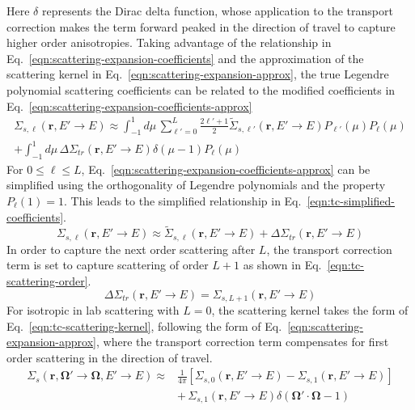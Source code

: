 Here $\delta$ represents the Dirac delta function, whose application to the transport correction makes the term forward peaked in the direction of travel to capture higher order anisotropies. Taking advantage of the relationship in Eq.~\ref{eqn:scattering-expansion-coefficients} and the approximation of the scattering kernel in Eq.~\ref{eqn:scattering-expansion-approx}, the true Legendre polynomial scattering coefficients can be related to the modified coefficients in Eq.~\ref{eqn:scattering-expansion-coefficients-approx}
\begin{equation}
\begin{split}
\Sigma_{s,\ell}\left(\mathbf{r}, E'\rightarrow E \right) \approx \int_{-1}^{1} d\mu \, \sum_{\ell'=0}^L \frac{2 \ell' + 1}{2} \tilde{\Sigma}_{s,\ell'}\left(\mathbf{r}, E'\rightarrow E \right) P_{\ell'}(\mu) P_\ell(\mu) \\ + \int_{-1}^{1} d\mu \, \Delta \Sigma_{\textit{tr}}\left(\mathbf{r}, E'\rightarrow E \right) \delta\left(\mu - 1\right) P_\ell(\mu)
\label{eqn:scattering-expansion-coefficients-approx}
\end{split}
\end{equation}
For $0 \leq \ell \leq L$, Eq.~\ref{eqn:scattering-expansion-coefficients-approx} can be simplified using the orthogonality of Legendre polynomials and the property $P_\ell(1) = 1$. This leads to the simplified relationship in Eq.~\ref{eqn:tc-simplified-coefficients}.
\begin{equation}
\Sigma_{s,\ell}\left(\mathbf{r}, E'\rightarrow E \right) \approx  \tilde{\Sigma}_{s,\ell}\left(\mathbf{r}, E'\rightarrow E \right) + \Delta \Sigma_{\textit{tr}}\left(\mathbf{r}, E'\rightarrow E \right)
\label{eqn:tc-simplified-coefficients}
\end{equation}
In order to capture the next order scattering after $L$, the transport correction term is set to capture scattering of order $L+1$ as shown in Eq.~\ref{eqn:tc-scattering-order}.
\begin{equation}
\Delta \Sigma_{\textit{tr}}\left(\mathbf{r}, E'\rightarrow E \right) = \Sigma_{s,L+1}\left(\mathbf{r}, E'\rightarrow E \right)
\label{eqn:tc-scattering-order}
\end{equation}
For isotropic in lab scattering with $L=0$, the scattering kernel takes the form of Eq.~\ref{eqn:tc-scattering-kernel}, following the form of Eq.~\ref{eqn:scattering-expansion-approx}, where the transport correction term compensates for first order scattering in the direction of travel.
\begin{equation}
\begin{split}
	\Sigma_{s}(\mathbf{r},\mathbf{\Omega'} \rightarrow \mathbf{\Omega},E'\rightarrow E) \approx & \frac{1}{4\pi}\left[\Sigma_{s,0}(\mathbf{r},{E'\rightarrow E}) - \Sigma_{s,1}(\mathbf{r},{E'\rightarrow E})\right] \\ & + \, \Sigma_{s,1}(\mathbf{r},{E'\rightarrow E})\delta(\mathbf{\Omega'} \cdot \mathbf{\Omega}-1)
\end{split}
\label{eqn:tc-scattering-kernel}
\end{equation}
